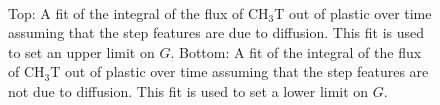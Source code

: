 \begin{figure}[h!]
\centering
{}\\
\caption{Top: A fit of the integral of the flux of CH$_3$T out of plastic over time assuming that the step features are due to diffusion.  This fit is used to set an upper limit on $G$.  Bottom: A fit of the integral of the flux of CH$_3$T out of plastic over time assuming that the step features are not due to diffusion.  This fit is used to set a lower limit on $G$. }
\label{fig:StepsFit}
\end{figure}

